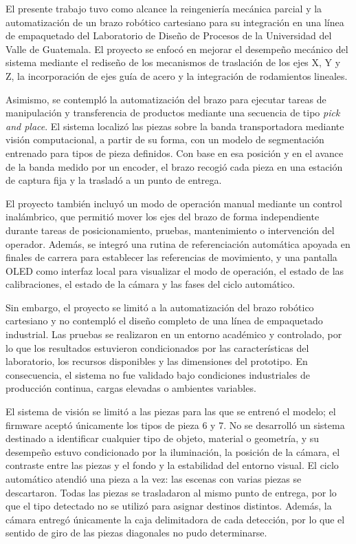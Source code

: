 El presente trabajo tuvo como alcance la reingeniería mecánica parcial y la automatización de un brazo robótico cartesiano para su integración en una línea de empaquetado del Laboratorio de Diseño de Procesos de la Universidad del Valle de Guatemala. El proyecto se enfocó en mejorar el desempeño mecánico del sistema mediante el rediseño de los mecanismos de traslación de los ejes X, Y y Z, la incorporación de ejes guía de acero y la integración de rodamientos lineales.

Asimismo, se contempló la automatización del brazo para ejecutar tareas de manipulación y transferencia de productos mediante una secuencia de tipo \textit{pick and place}. El sistema localizó las piezas sobre la banda transportadora mediante visión computacional, a partir de su forma, con un modelo de segmentación entrenado para tipos de pieza definidos. Con base en esa posición y en el avance de la banda medido por un encoder, el brazo recogió cada pieza en una estación de captura fija y la trasladó a un punto de entrega.

El proyecto también incluyó un modo de operación manual mediante un control inalámbrico, que permitió mover los ejes del brazo de forma independiente durante tareas de posicionamiento, pruebas, mantenimiento o intervención del operador. Además, se integró una rutina de referenciación automática apoyada en finales de carrera para establecer las referencias de movimiento, y una pantalla OLED como interfaz local para visualizar el modo de operación, el estado de las calibraciones, el estado de la cámara y las fases del ciclo automático.

Sin embargo, el proyecto se limitó a la automatización del brazo robótico cartesiano y no contempló el diseño completo de una línea de empaquetado industrial. Las pruebas se realizaron en un entorno académico y controlado, por lo que los resultados estuvieron condicionados por las características del laboratorio, los recursos disponibles y las dimensiones del prototipo. En consecuencia, el sistema no fue validado bajo condiciones industriales de producción continua, cargas elevadas o ambientes variables.

El sistema de visión se limitó a las piezas para las que se entrenó el modelo; el firmware aceptó únicamente los tipos de pieza 6 y 7. No se desarrolló un sistema destinado a identificar cualquier tipo de objeto, material o geometría, y su desempeño estuvo condicionado por la iluminación, la posición de la cámara, el contraste entre las piezas y el fondo y la estabilidad del entorno visual. El ciclo automático atendió una pieza a la vez: las escenas con varias piezas se descartaron. Todas las piezas se trasladaron al mismo punto de entrega, por lo que el tipo detectado no se utilizó para asignar destinos distintos. Además, la cámara entregó únicamente la caja delimitadora de cada detección, por lo que el sentido de giro de las piezas diagonales no pudo determinarse.

